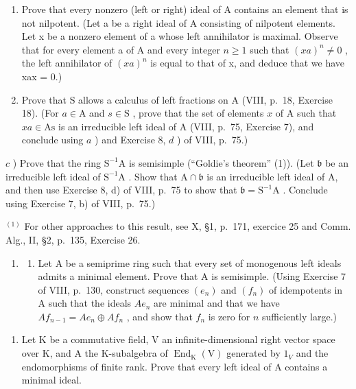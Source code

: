 \begin{enumerate}
\def\labelenumi{\alph{enumi})}
\item
  Prove that every nonzero (left or right) ideal of A contains an element that is not nilpotent. (Let a be a right ideal of A consisting of nilpotent elements. Let x be a nonzero element of a whose left annihilator is maximal. Observe that for every element a of A and every integer \(n \geqslant 1\) such that \((xa)^{n} \neq 0\) , the left annihilator of \((xa)^{n}\) is equal to that of x, and deduce that we have xax = 0.)
\item
  Prove that S allows a calculus of left fractions on A (VIII, p.~18, Exercise 18). (For \(a \in \mathrm{A}\) and \(s \in \mathrm{S}\) , prove that the set of elements \(x\) of A such that \(xa \in \mathrm{As}\) is an irreducible left ideal of A (VIII, p.~75, Exercise 7), and conclude using \(a\) ) and Exercise 8, \(d\) ) of VIII, p.~75.)
\end{enumerate}

\(c\) ) Prove that the ring \(\mathrm{S}^{-1}\mathrm{A}\) is semisimple (``Goldie's theorem'' (1)). (Let \(\mathfrak{b}\) be an irreducible left ideal of \(\mathrm{S}^{-1}\mathrm{A}\) . Show that \(\mathrm{A} \cap \mathfrak{b}\) is an irreducible left ideal of A, and then use Exercise 8, d) of VIII, p.~75 to show that \(\mathfrak{b} = \mathrm{S}^{-1}\mathrm{A}\) . Conclude using Exercise 7, b) of VIII, p.~75.)

\( ^{(1)} \) For other approaches to this result, see X, §1, p.~171, exercice 25 and Comm. Alg., II, §2, p.~135, Exercise 26.

\begin{enumerate}
\def\labelenumi{\arabic{enumi})}
\setcounter{enumi}{4}
\tightlist
\item
  \begin{enumerate}
  \def\labelenumii{\alph{enumii})}
  \tightlist
  \item
    Let A be a semiprime ring such that every set of monogenous left ideals admits a minimal element. Prove that A is semisimple. (Using Exercise 7 of VIII, p.~130, construct sequences \((e_n)\) and \((f_n)\) of idempotents in A such that the ideals \(Ae_n\) are minimal and that we have \(A f_{n-1} = Ae_n \oplus Af_n\) , and show that \(f_n\) is zero for \(n\) sufficiently large.)
  \end{enumerate}
\end{enumerate}

\begin{enumerate}
\def\labelenumi{\alph{enumi})}
\setcounter{enumi}{1}
\tightlist
\item
  Let K be a commutative field, V an infinite-dimensional right vector space over K, and A the K-subalgebra of \(\operatorname{End}_{\mathrm{K}}(\mathrm{V})\) generated by \(1_{V}\) and the endomorphisms of finite rank. Prove that every left ideal of A contains a minimal ideal.
\end{enumerate}


